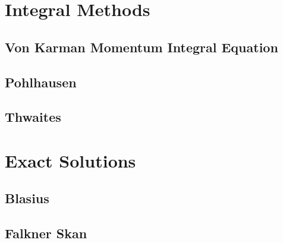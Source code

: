 \documentclass[oneside,a4paper,11pt]{report}
\begin{document}
\section{Integral Methods}

\subsection{Von Karman Momentum Integral Equation}

\subsection{Pohlhausen}

\subsection{Thwaites}

\section{Exact Solutions}

\subsection{Blasius}

\subsection{Falkner Skan}


%
%
\appendix
%
%
\end{document}
